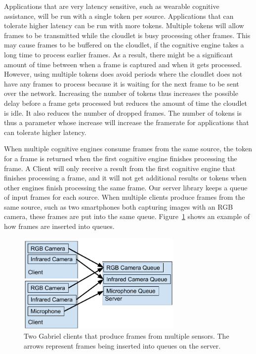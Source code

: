 Applications that are very latency sensitive, such as
wearable cognitive assistance, will be run with a single token per source.
Applications that can tolerate higher latency can be run with more tokens.
Multiple tokens
will allow frames to be transmitted while the cloudlet is busy processing other
frames. This may cause frames to be buffered on the cloudlet, if the
cognitive engine takes a long time to process earlier frames. As a result, there
might be a significant amount of time between when a frame is captured and when
it gets processed. However, using multiple tokens does avoid periods where the
cloudlet does not have any frames to process because it is waiting for the next
frame to be sent over the network. Increasing
the number of tokens thus increases the possible delay before a frame gets
processed but reduces the amount of time the cloudlet is idle.
It also reduces the number of dropped frames.
The number of tokens is thus a parameter whose increase will
increase the framerate for applications that can tolerate higher latency.

When multiple cognitive engines consume frames from the same source, the token
for a frame is returned when the first cognitive engine finishes processing the
frame.
A Client will only receive a result from the first cognitive engine that
finishes processing a frame, and it will not get additional results or tokens
when other engines finish processing the same frame. Our server library keeps a
queue of input frames for each source. When multiple clients produce frames from
the same source, such as two smartphones both capturing images with an RGB
camera, these frames are put into the same queue.
Figure~\ref{fig:queues} shows an example of how frames are inserted into queues.

\begin{figure}[h!]
  \includegraphics[width=8cm]{figures/queues.pdf}
  \caption{Two Gabriel clients that produce frames from multiple sensors.
    The arrows represent frames being inserted into queues on the server.
  }\label{fig:queues}
\end{figure}


